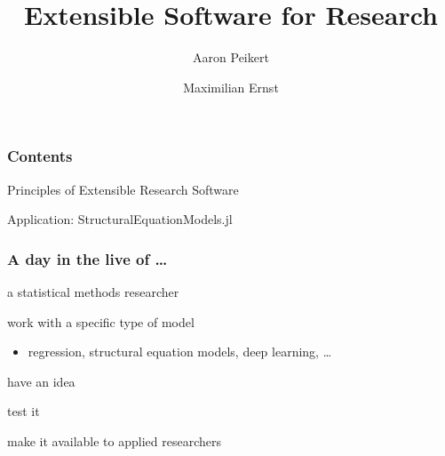\documentclass{beamer}
\title{Extensible Software for Research}
\author{Aaron Peikert}
\date{Maximilian Ernst}
\newenvironment{wideitemize}{
    \itemize\addtolength{\itemsep}{15pt}\addtolength{\topsep}{10pt}}{\enditemize}
\begin{document}
	\setcounter{showProgressBar}{0}
	\setcounter{showSlideNumbers}{0}

	\frame{\titlepage}

	\setcounter{framenumber}{0}
	\setcounter{showProgressBar}{1}
	\setcounter{showSlideNumbers}{1}
	
    \begin{frame}
        \frametitle{Contents}
        \vspace{1cm}
        \begin{wideitemize}
            \item Principles of Extensible Research Software
        \end{wideitemize}
        \vspace{1cm}
        \begin{wideitemize}
            \item Application: StructuralEquationModels.jl
        \end{wideitemize}
    \end{frame}


    \begin{frame}
        \frametitle{A day in the live of \ldots}
        a statistical methods researcher\\
        \vspace{0.8cm}
        \begin{wideitemize}
            \item<2-> work with a specific type of model
            \begin{itemize}
            \item<2-> regression, structural equation models, deep learning, \ldots
            \end{itemize}
            \item<3-> have an idea
            \item<4-> test it
            \item<5-> make it available to applied researchers
        \end{wideitemize}
    \end{frame}
\end{document}
